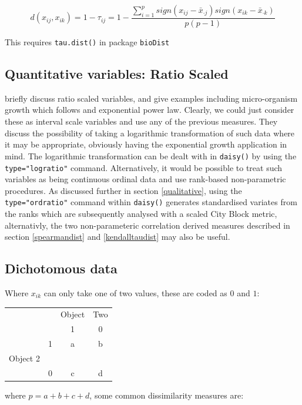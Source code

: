 \begin{displaymath}
\label{kendalltaudistF}
d(x_{ij},x_{ik}) = 1 - \tau_{ij} = 1 - \frac{\sum_{i=1}^{p} sign(x_{ij} - \bar{x}_{\cdot j}) sign(x_{ik} - \bar{x}_{\cdot k})}{p(p-1)}
\end{displaymath}

This requires \verb+tau.dist()+ in package \verb+bioDist+


\subsection{Quantitative variables: Ratio Scaled}

\cite{Kaufman+Rousseeuw:1989} briefly discuss ratio scaled variables, and give examples including micro-organism growth which follows and exponential power law.   Clearly, we could just consider these as interval scale variables and use any of the previous measures.   They discuss the possibility of taking a logarithmic transformation of such data where it may be appropriate, obviously having the exponential growth application in mind.  The logarithmic transformation can be dealt with in \verb+daisy()+ by using the \verb+type="logratio"+ command.   Alternatively, it would be possible to treat such variables as being continuous ordinal data and use rank-based non-parametric procedures.   As discussed further in section \ref{qualitative}, using the  \verb+type="ordratio"+ command within \verb+daisy()+ generates standardised variates from the ranks which are subsequently analysed with a scaled City Block metric, alternativly, the two non-parameteric correlation derived measures described in section \ref{spearmandist} and \ref{kendalltaudist} may also be useful.

\subsection{Dichotomous data}
\label{dichotomousdist}

Where $x_{ik}$ can only take one of two values, these are coded as $0$ and $1$:

\begin{tabular}{lr|cc}
 & & Object & Two \\
 & & 1 & 0\\
\hline
 & 1 & a & b\\
Object 2 & & & \\
 & 0 & c & d\\
\end{tabular}
where $p = a + b + c + d$, some common dissimilarity measures are:

